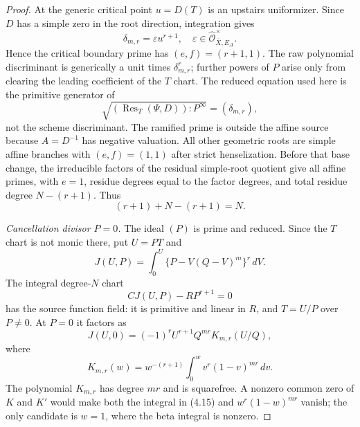 \begin{proof}
At the generic critical point $u=D(T)$ is an upstairs uniformizer.  Since
$D$ has a simple zero in the root direction, integration gives
\[
 \delta_{m,r}=\varepsilon u^{r+1},\quad
 \varepsilon\in
 \widehat{\mathcal O}_{\overline X,E_\Delta}^{\times}.   \tag{4.10}
\]
Hence the critical boundary prime has $(e,f)=(r+1,1)$.  The raw polynomial
discriminant is generically a unit times $\delta_{m,r}^{r}$; further powers
of $P$ arise only from clearing the leading coefficient of the $T$ chart.
The reduced equation used here is the primitive generator of
\[
 \sqrt{(\operatorname{Res}_T(\Psi,D)):P^\infty}
   =(\delta_{m,r}),                                       \tag{4.11}
\]
not the scheme discriminant.  The ramified prime is outside the affine
source because $A=D^{-1}$ has negative valuation.  All other geometric roots
are simple affine branches with $(e,f)=(1,1)$ after strict henselization.
Before that base change, the irreducible factors of the residual
simple-root quotient give all affine primes, with $e=1$, residue degrees
equal to the factor degrees, and total residue degree $N-(r+1)$.  Thus
\[
 (r+1)+N-(r+1)=N.                                        \tag{4.12}
\]

\smallskip
\noindent\emph{Cancellation divisor $P=0$.}
The ideal $(P)$ is prime and reduced.  Since the $T$ chart is not monic
there, put $U=PT$ and
\[
 J(U,P)=\int_0^U\{P-V(Q-V)^m\}^r\,dV.
\]
The integral degree-$N$ chart
\[
 CJ(U,P)-RP^{r+1}=0                                      \tag{4.13}
\]
has the source function field: it is primitive and linear in $R$, and
$T=U/P$ over $P\ne0$.  At $P=0$ it factors as
\[
 J(U,0)=(-1)^rU^{r+1}Q^{mr}K_{m,r}(U/Q),                 \tag{4.14}
\]
where
\[
 K_{m,r}(w)=w^{-(r+1)}\int_0^w v^r(1-v)^{mr}\,dv.        \tag{4.15}
\]
The polynomial $K_{m,r}$ has degree $mr$ and is squarefree.  A nonzero
common zero of $K$ and $K'$ would make both the integral in (4.15) and
$w^r(1-w)^{mr}$ vanish; the only candidate is $w=1$, where the beta integral
is nonzero.


\end{proof}
